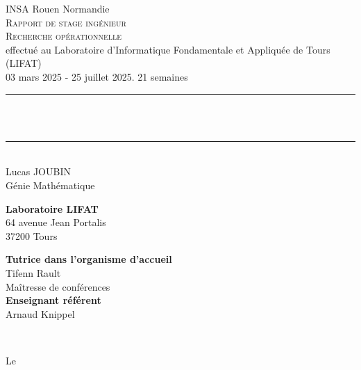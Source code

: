 \begin{titlepage}
    \begin{center}
        {\Large INSA Rouen Normandie}\\[1. cm]
        \textsc{\LARGE Rapport de stage ingénieur}\\
        \textsc{\Large Recherche opérationnelle}
    \\[1. cm]
    \large effectué au Laboratoire d'Informatique Fondamentale et Appliquée de Tours (LIFAT) \\[.5 cm]
    03 mars 2025 - 25 juillet 2025. 21 semaines\\[1 cm]
	\rule{\linewidth}{0.2 mm} \\[1 cm]
	{ \huge \bfseries \thetitle}\\[.7 cm]
	\rule{\linewidth}{0.2 mm} \\[1 cm]
    	{\Large Lucas JOUBIN}\\[.2 cm]
    	{\large Génie Mathématique}\\[1 cm]
    \end{center}
	\begin{minipage}{0.5\textwidth}
		\begin{flushleft} \large
		  \textbf{Laboratoire LIFAT}\\
		  64 avenue Jean Portalis\\
            37200 Tours\\
		\end{flushleft}
	\end{minipage}
	\begin{minipage}{0.5\textwidth}
        \begin{flushright} \large
			\textbf{Tutrice dans l'organisme d'accueil} \\
			Tifenn Rault\\
            Maîtresse de conférences \\
            \textbf{Enseignant référent} \\
			Arnaud Knippel\\
		\end{flushright}
	\end{minipage}\\[2 cm]
	\begin{center} Le \thedate
	\end{center}
\end{titlepage}

